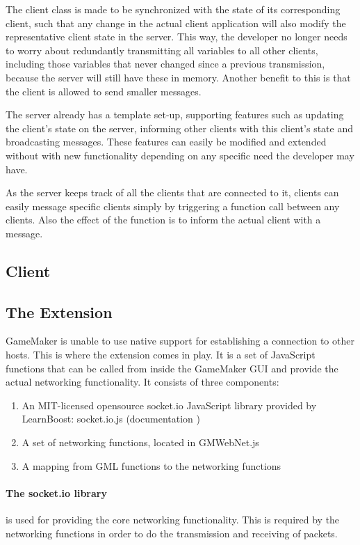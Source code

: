 \documentclass[bsc,frontabs,twoside,singlespacing,parskip,deptreport]{infthesis}     %
\begin{document}
The client class is made to be synchronized with the state of its corresponding client, such that any change in the actual client application will also modify the representative client state in the server. This way, the developer no longer needs to worry about redundantly transmitting all variables to all other clients, including those variables that never changed since a previous transmission, because the server will still have these in memory. Another benefit to this is that the client is allowed to send smaller messages.

The server already has a template set-up, supporting features such as updating the client's state on the server, informing other clients with this client's state and broadcasting messages. These features can easily be modified and extended without with new functionality depending on any specific need the developer may have.

As the server keeps track of all the clients that are connected to it, clients can easily message specific clients simply by triggering a function call between any clients. Also the effect of the function is to inform the actual client with a message.

\subsection{Client}
\subsection{The Extension}
GameMaker is unable to use native support for establishing a connection to other hosts. This is where the extension comes in play.
It is a set of JavaScript functions that can be called from inside the GameMaker GUI and provide the actual networking functionality.
It consists of three components:
\begin{enumerate}
\item An MIT-licensed opensource socket.io JavaScript library provided by LearnBoost: socket.io.js (documentation \cite{socketiojs})
\item A set of networking functions, located in GMWebNet.js
\item A mapping from GML functions to the networking functions
\end{enumerate}

\paragraph*{The socket.io library}
is used for providing the core networking functionality. This is required by the networking functions in order to do the transmission and receiving of packets.
\end{document}
